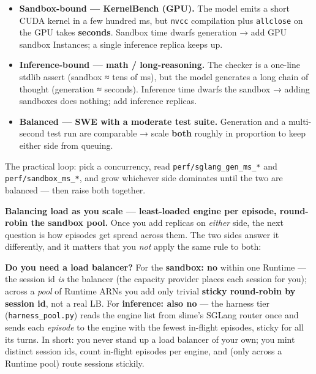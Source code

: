 \documentclass[
  paper=a4,
  ,captions=tableheading
]{scrartcl}
\providecommand{\tightlist}{%
  \setlength{\itemsep}{0pt}\setlength{\parskip}{0pt}}
\renewenvironment{quote}{\begin{customblockquote}\list{}{\rightmargin=0em\leftmargin=0em}%
\item\relax\color{blockquote-text}\ignorespaces}{\unskip\unskip\endlist\end{customblockquote}}
\begin{document}
\begin{itemize}
\tightlist
\item
  \textbf{Sandbox-bound --- KernelBench (GPU).} The model emits a short
  CUDA kernel in a few hundred ms, but \texttt{nvcc} compilation plus
  \texttt{allclose} on the GPU takes \textbf{seconds}. Sandbox time
  dwarfs generation → add GPU sandbox Instances; a single inference
  replica keeps up.
\item
  \textbf{Inference-bound --- math / long-reasoning.} The checker is a
  one-line stdlib assert (sandbox ≈ tens of ms), but the model generates
  a long chain of thought (generation ≈ seconds). Inference time dwarfs
  the sandbox → adding sandboxes does nothing; add inference replicas.
\item
  \textbf{Balanced --- SWE with a moderate test suite.} Generation and a
  multi-second test run are comparable → scale \textbf{both} roughly in
  proportion to keep either side from queuing.
\end{itemize}

The practical loop: pick a concurrency, read
\texttt{perf/sglang\_gen\_ms\_*} and \texttt{perf/sandbox\_ms\_*}, and
grow whichever side dominates until the two are balanced --- then raise
both together.

\textbf{Balancing load as you scale --- least-loaded engine per episode,
round-robin the sandbox pool.} Once you add replicas on \emph{either}
side, the next question is how episodes get spread across them. The two
sides answer it differently, and it matters that you \emph{not} apply
the same rule to both:

\begin{quote}
\textbf{Do you need a load balancer?} For the \textbf{sandbox: no}
within one Runtime --- the session id \emph{is} the balancer (the
capacity provider places each session for you); across a \emph{pool} of
Runtime ARNs you add only trivial \textbf{sticky round-robin by session
id}, not a real LB. For \textbf{inference: also no} --- the harness tier
(\texttt{harness\_pool.py}) reads the engine list from slime's SGLang
router once and sends each \emph{episode} to the engine with the fewest
in-flight episodes, sticky for all its turns. In short: you never stand
up a load balancer of your own; you mint distinct session ids, count
in-flight episodes per engine, and (only across a Runtime pool) route
sessions stickily.
\end{quote}
\end{document}
